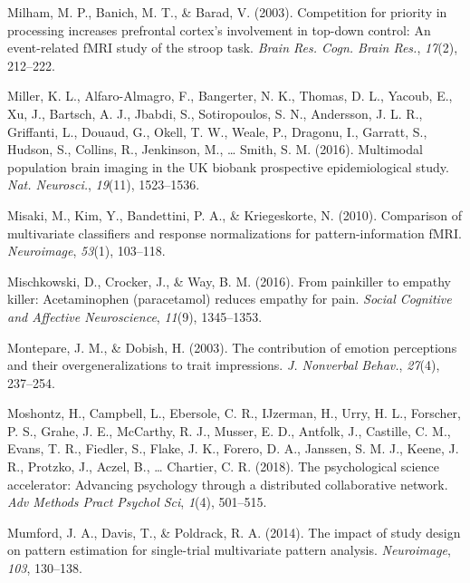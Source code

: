 \documentclass[12pt,american,a4paper,oneside,]{memoir} %
\begin{document}
\leavevmode\hypertarget{ref-Milham2003-zc}{}%
Milham, M. P., Banich, M. T., \& Barad, V. (2003). Competition for priority in processing increases prefrontal cortex's involvement in top-down control: An event-related fMRI study of the stroop task. \emph{Brain Res. Cogn. Brain Res.}, \emph{17}(2), 212--222.

\leavevmode\hypertarget{ref-Miller2016-oi}{}%
Miller, K. L., Alfaro-Almagro, F., Bangerter, N. K., Thomas, D. L., Yacoub, E., Xu, J., Bartsch, A. J., Jbabdi, S., Sotiropoulos, S. N., Andersson, J. L. R., Griffanti, L., Douaud, G., Okell, T. W., Weale, P., Dragonu, I., Garratt, S., Hudson, S., Collins, R., Jenkinson, M., \ldots{} Smith, S. M. (2016). Multimodal population brain imaging in the UK biobank prospective epidemiological study. \emph{Nat. Neurosci.}, \emph{19}(11), 1523--1536.

\leavevmode\hypertarget{ref-misaki2010comparison}{}%
Misaki, M., Kim, Y., Bandettini, P. A., \& Kriegeskorte, N. (2010). Comparison of multivariate classifiers and response normalizations for pattern-information fMRI. \emph{Neuroimage}, \emph{53}(1), 103--118.

\leavevmode\hypertarget{ref-mischkowski2016painkiller}{}%
Mischkowski, D., Crocker, J., \& Way, B. M. (2016). From painkiller to empathy killer: Acetaminophen (paracetamol) reduces empathy for pain. \emph{Social Cognitive and Affective Neuroscience}, \emph{11}(9), 1345--1353.

\leavevmode\hypertarget{ref-Montepare2003-hy}{}%
Montepare, J. M., \& Dobish, H. (2003). The contribution of emotion perceptions and their overgeneralizations to trait impressions. \emph{J. Nonverbal Behav.}, \emph{27}(4), 237--254.

\leavevmode\hypertarget{ref-Moshontz2018-rc}{}%
Moshontz, H., Campbell, L., Ebersole, C. R., IJzerman, H., Urry, H. L., Forscher, P. S., Grahe, J. E., McCarthy, R. J., Musser, E. D., Antfolk, J., Castille, C. M., Evans, T. R., Fiedler, S., Flake, J. K., Forero, D. A., Janssen, S. M. J., Keene, J. R., Protzko, J., Aczel, B., \ldots{} Chartier, C. R. (2018). The psychological science accelerator: Advancing psychology through a distributed collaborative network. \emph{Adv Methods Pract Psychol Sci}, \emph{1}(4), 501--515.

\leavevmode\hypertarget{ref-mumford2014impact}{}%
Mumford, J. A., Davis, T., \& Poldrack, R. A. (2014). The impact of study design on pattern estimation for single-trial multivariate pattern analysis. \emph{Neuroimage}, \emph{103}, 130--138.
\end{document}
